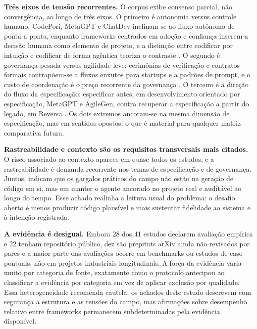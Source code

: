 \noindent\textbf{Três eixos de tensão recorrentes.} O corpus exibe consenso parcial, não convergência, ao longo de três eixos. O primeiro é autonomia versus controle humano: CodePori, MetaGPT e ChatDev inclinam-se ao fluxo autônomo de ponta a ponta, enquanto frameworks centrados em adoção e confiança inserem a decisão humana como elemento de projeto, e a distinção entre codificar por intuição e codificar de forma agêntica teoriza o contraste \cite{ZeeshanRasheed2024,SiruiHong2023,ChenQian2023,SaiZhang2025,DanielRusso2024,Baron2025,RanjanSapkota2025}. O segundo é governança pesada versus agilidade leve: cerimônias de verificação e contratos formais contrapõem-se a fluxos enxutos para startups e a padrões de prompt, e o custo de coordenação é o preço recorrente da governança \cite{Merchant2025,Paduraru2026,Khan2026,JulesWhite2023}. O terceiro é a direção do fluxo da especificação: especificar antes, em desenvolvimento orientado por especificação, MetaGPT e AgileGen, contra recuperar a especificação a partir do legado, em Reversa \cite{DeepakBabuPiskala2026,SiruiHong2023,SaiZhang2025,Macedo2026}. Os dois extremos ancoram-se na mesma dimensão de especificação, mas em sentidos opostos, o que é material para qualquer matriz comparativa futura.

\noindent\textbf{Rastreabilidade e contexto são os requisitos transversais mais citados.} O risco associado ao contexto aparece em quase todos os estudos, e a rastreabilidade é demanda recorrente nos temas de especificação e de governança. Juntos, indicam que os gargalos práticos do campo não estão na geração de código em si, mas em manter o agente ancorado no projeto real e auditável ao longo do tempo. Esse achado realinha a leitura usual do problema: o desafio aberto é menos produzir código plausível e mais sustentar fidelidade ao sistema e à intenção registrada.

\noindent\textbf{A evidência é desigual.} Embora 28 dos 41 estudos declarem avaliação empírica e 22 tenham repositório público, dez são preprints arXiv ainda não revisados por pares e a maior parte das avaliações ocorre em benchmarks ou estudos de caso pontuais, não em projetos industriais longitudinais. A força da evidência varia muito por categoria de fonte, exatamente como o protocolo antecipou ao classificar a evidência por categoria em vez de aplicar exclusão por qualidade. Essa heterogeneidade recomenda cautela: os achados deste estudo descrevem com segurança a estrutura e as tensões do campo, mas afirmações sobre desempenho relativo entre frameworks permanecem subdeterminadas pela evidência disponível.
